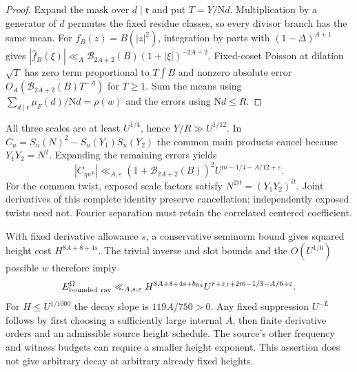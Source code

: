 \documentclass[11pt]{article}
\theoremstyle{definition}
\newcommand{\N}{\mathrm N}
\newcommand{\eps}{\varepsilon}
\begin{document}
\begin{proof}
Expand the mask over $d\mid\mathfrak r$ and put
$T=Y/\N d$. Multiplication by a generator of $d$ permutes the fixed
residue classes, so every divisor branch has the same mean.
For $f_B(z)=B(|z|^2)$, integration by parts with
$(1-\Delta)^{A+1}$ gives
$|\widehat f_B(\xi)|\ll_A\mathcal B_{2A+2}(B)
(1+|\xi|)^{-2A-2}$. Fixed-coset Poisson at dilation $\sqrt T$
has zero term proportional to $T\int B$ and nonzero absolute error
$O_A(\mathcal B_{2A+2}(B)T^{-A})$ for $T\ge1$.
Sum the means using $\sum_{d\mid\mathfrak r}\mu_F(d)/\N d=\rho(w)$
and the errors using $\N d\le R$.
\end{proof}

All three scales are at least $U^{1/4}$, hence $Y/R\gg U^{1/12}$.
In $C_u=S_u(N)^2-S_u(Y_1)S_u(Y_2)$ the common main products
cancel because $Y_1Y_2=N^2$. Expanding the remaining errors yields
\[
 |C_{\eta w^6}|\ll_{A,\eps}
 (1+\mathcal B_{2A+2}(B))^2 U^{m-1/4-A/12+\eps}.
\]
For the common twist, exposed scale factors satisfy
$N^{2it}=(Y_1Y_2)^{it}$. Joint derivatives of this complete
identity preserve cancellation; independently exposed twists need
not. Fourier separation must retain the correlated centered coefficient.

With fixed derivative allowance $s$, a conservative seminorm bound
gives squared height cost $H^{8A+8+4s}$. The trivial inverse and slot
bounds and the $O(U^{1/6})$ possible $w$ therefore imply
\begin{equation}\label{ctr-principal-mass}
 E_{\rm bounded\ ray}^{\Omega}
 \ll_{A,s,\eps}H^{8A+8+4s+b_{\rm fix}}
 U^{r+z_J+2m-1/3-A/6+\eps}.
\end{equation}
For $H\le U^{1/1000}$ the decay slope is $119A/750>0$.
Any fixed suppression $U^{-L}$ follows by first choosing a sufficiently
large internal $A$, then finite derivative orders and an admissible
source height schedule. The source's other frequency and witness
budgets can require a smaller height exponent. This assertion does
not give arbitrary decay at arbitrary already fixed heights.
\end{document}
